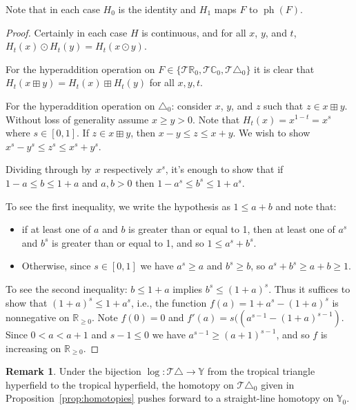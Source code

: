\documentclass[10pt, preprint]{article}
\theoremstyle{definition}
\newtheorem{remark}[theorem]{Remark}
\begin{document}
Note that in each case $H_{0}$ is the identity and $H_{1}$ maps $F$ to
$\operatorname{ph}(F)$.

\begin{proof}
Certainly in each case $H$ is continuous, and for all $x$, $y$, and
$t$, $H_{t}(x)\odot H_{t}(y)=H_{t}(x\odot y)$.

For the hyperaddition operation on $F\in \{\mathcal{T
}\mathbb{R}_{0},\mathcal{T }\mathbb{C}_{0},\mathcal{T }\triangle _{0}
\}$ it is clear that $H_{t}(x\boxplus y)= H_{t}(x)\boxplus H_{t}(y)$ for
all $x,y,t$.

For the hyperaddition operation on $\triangle _{0}$: consider $x$,
$y$, and $z$ such that $z\in x\boxplus y$. Without loss of generality
assume $x \geq y > 0$. Note that $H_{t}(x) = x^{1-t} = x^{s}$ where
$s \in [0,1]$. If $z\in x\boxplus y$, then $x-y\leq z\leq x+y$. We wish
to show $x^{s}-y^{s}\leq z^{s}\leq x^{s}+y^{s}$.

Dividing through by $x$ respectively $x^{s}$, it's enough to show that
if $1-a\leq b\leq 1+a$ and $ a ,b>0$ then $1-a^{s}\leq b^{s}\leq 1+a
^{s}$.\goodbreak

To see the first inequality, we write the hypothesis as $1\leq a+b$ and
note that:\vspace*{-2pt}
%
\begin{itemize}%
\item
if at least one of $a$ and $b$ is greater than or equal to 1, then at
least one of $a^{s}$ and $b^{s}$ is greater than or equal to 1, and so
$1\leq a^{s}+b^{s}$.
%
\item
Otherwise, since $s\in [0,1]$ we have $a^{s}\geq a$ and $b^{s}\geq b$,
so $a^{s}+b^{s}\geq a+b\geq 1$.\vspace*{-2pt}
\end{itemize}

To see the second inequality: $b\leq 1+a$ implies $b^{s}\leq (1+a)^{s}$.
Thus it suffices to show that $(1+a)^{s} \leq 1+a^{s}$, i.e., the
function $f(a)=1+a^{s}-(1+a)^{s}$ is nonnegative on $\mathbb{R}_{
\geq 0}$. Note $f(0)=0$ and $f'(a)=s((a^{s-1}-(1+a)^{s-1})$. Since
$0<a<a+1$ and $s-1\leq 0$ we have $a^{s-1}\geq (a+1)^{s-1}$, and so
$f$ is increasing on $\mathbb{R}_{\geq 0}$.
\end{proof}

\begin{remark}
Under the bijection $\log :\mathcal{T }\triangle \to \mathbb{Y}$ from
the tropical triangle hyperfield to the tropical hyperfield, the
homotopy on $\mathcal{T }\triangle _{0}$ given in
Proposition~\ref{prop:homotopies} pushes forward to a straight-line
homotopy on $\mathbb{Y}_{0}$.\vspace*{-1pt}
\end{remark}
\end{document}
